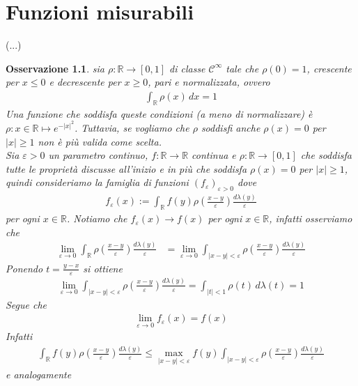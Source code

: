 \documentclass[oneside, 11pt]{amsbook}
\newcommand{\R}{\mathbb{R}}
\newcommand{\cC}{{\mathcal C}}
\newcommand{\0}{{(0)}}
\newcommand{\3}{{(3)}}
\newcommand{\e}{{\varepsilon}}
\theoremstyle{colonplain}
\theoremstyle{colondefinition}
\theoremstyle{colonremark}
\newtheorem{rmk}[thm]{Osservazione}
\numberwithin{equation}{chapter}
\begin{document}
\chapter{Funzioni misurabili}
(...)
\begin{rmk}\label{ApproxDelta}
    sia $\rho : \R \longrightarrow [0, 1]$ di classe $\cC^\infty$ tale che $\rho(0) = 1$, crescente per $x \leq 0$ e decrescente per $x \geq 0$, pari e normalizzata, ovvero
    \begin{align}
        \int_\R \rho(x) \, dx = 1
    \end{align}
    Una funzione che soddisfa queste condizioni (a meno di normalizzare) è $\rho : x \in \R \mapsto e^{-|x|^2}$. Tuttavia, se vogliamo che $\rho$ soddisfi anche $\rho(x) = 0$ per $|x| \geq 1$ non è più valida come scelta. \\
    Sia $\e > 0$ un parametro continuo, $f : \R \longrightarrow \R$ continua e $\rho : \R \longrightarrow [0, 1]$ che soddisfa tutte le proprietà discusse all'inizio e in più che soddisfa $\rho(x) = 0$ per $|x| \geq 1$, quindi consideriamo la famiglia di funzioni $(f_\e)_{\e > 0}$ dove
    \begin{align}
        f_\e(x) := \int_{\R} f(y)\rho\left(\frac{x - y}{\e}\right)\frac{d\lambda(y)}{\e}
    \end{align}
    per ogni $x \in \R$. Notiamo che $f_\e(x) \rightarrow f(x)$ per ogni $x \in \R$, infatti osserviamo che
    \begin{align}
        \lim_{\e \rightarrow 0} \int_{\R} \rho\left(\frac{x - y}{\e}\right)\frac{d\lambda(y)}{\e} &= \lim_{\e \rightarrow 0} \int_{|x - y| < \e} \rho\left(\frac{x - y}{\e}\right)\frac{d\lambda(y)}{\e}
    \end{align}
    Ponendo $t = \frac{y - x}{\e}$ si ottiene
    \begin{align}
        \lim_{\e \rightarrow 0} \int_{|x - y| < \e} \rho\left(\frac{x - y}{\e}\right)\frac{d\lambda(y)}{\e} = \int_{|t| < 1} \rho(t) \, d\lambda(t) = 1
    \end{align}
    Segue che
    \begin{align}
        \lim_{\e \rightarrow 0} f_\e(x) = f(x)
    \end{align}
    Infatti
    \begin{align}
        \int_\R f(y)\rho\left(\frac{x - y}{\e}\right)\frac{d\lambda(y)}{\e} \leq \max_{|x - y| < \e} f(y) \int_{|x - y| < \e} \rho\left(\frac{x - y}{\e}\right) \frac{d\lambda(y)}{\e}
    \end{align}
    e analogamente
    \begin{align}

\end{align}
\end{rmk}
\end{document}
